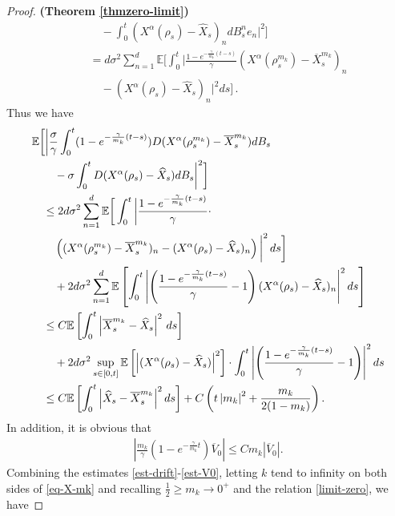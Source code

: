 \documentclass{ims9x6}
\newcommand{\nn}{\nonumber}
\newcommand{\EE}{\mathbb{E}}
\newcommand{\OV}{\overline{V}}
\newcommand{\OX}{\overline{X}}
\begin{document}
\begin{proof}{\textbf{(Theorem \ref{thmzero-limit})}}
{\begin{align}
	&\qquad- \int_0^t  (X^{\alpha}(\rho_s)-\widehat X_s)_ndB_s^ne_n \bigg|^2\bigg]
	\nonumber \\
	&\quad =d{\sigma^2} \sum_{n=1}^d\EE \bigg[\int_0^t \bigg| \frac{1-e^{-\frac{\gamma}{{m_k}}(t-s)}} {\gamma} (X^{\alpha}(\rho^{m_k}_s)-\OX_s^{m_k})_n \nn\\
	&\qquad - (X^{\alpha}(\rho_s)-\widehat X_s)_n\bigg|^2 ds \bigg]\,.
	\end{align}}
	Thus we have
{\small 		\begin{align}
	&\EE \bigg[ \bigg|
	\frac{\sigma}{\gamma}
	\int_0^t(1-e^{-\frac{\gamma}{{m_k}}(t-s)}) D(X^{\alpha}(\rho^{m_k}_s)-\OX_s^{m_k})dB_s\nn\\
	& \quad\quad- \sigma \int_0^t  D(X^{\alpha}(\rho_s)-\widehat X_s)dB_s \bigg|^2\bigg]
	\nonumber \\
	&\quad \leq 
	{2d\sigma^2} \sum_{n=1}^d
	\EE \bigg[ 
	\int_0^t \bigg| \frac{1-e^{-\frac{\gamma}{{m_k}}(t-s)}} {\gamma}   \cdot \nn\\
	&\qquad \left( (X^{\alpha}(\rho^{m_k}_s)-\OX_s^{m_k})_n -     (X^{\alpha}(\rho_s)-\widehat X_s)_n\right) \bigg|^2\,ds\bigg]
	\nonumber \\
	&\qquad+  {2d\sigma^2}  \sum_{n=1}^d \EE \left[ 
	\int_0^t \left|
	\left(
	\frac{1-e^{-\frac{\gamma}{{m_k}}(t-s)}} {\gamma} -1
	\right)
	(X^{\alpha}(\rho_s)-\widehat X_s)_n\right|^2 ds \right]
	\nonumber \\
	&\quad \leq 
	C
	\EE \left[ 
	\int_0^t \left|     \OX_s^{m_k}     -\widehat X_s  \right|^2\,ds\right]\nonumber \\
	&\qquad +  {2d\sigma^2} \sup_{s\in [0,t]}  \EE \left[  \left|(X^{\alpha}(\rho_s)-\widehat X_s)\right|^2 \right] \cdot 
	\int_0^t \left|
	\left(
	\frac{1-e^{-\frac{\gamma}{{m_k}}(t-s)}} {\gamma} -1
	\right)
	\right|^2 ds  
	\notag\\
	 &\quad \leq 
	C \EE \left[ \int_0^t  \left|   \widehat X_s-\OX_s^{m_k} \right|^2 ds \right]
	+ C  
	\left( t \left|{m_k}\right|^2  + \frac{m_k}{2(1-m_k)}   \right) .
	\label{ineq-converge}
	\end{align}}
	In addition, it is obvious that
	\begin{align}
	\left| \frac{m_k}{\gamma}(1-e^{-\frac{\gamma}{m_k}t})\OV_0\right|
	\leq  C m_k \left| \OV_0\right|. \label{est-V0}
	\end{align}	
	Combining the estimates \eqref{est-drift}-\eqref{est-V0}, letting $k$ tend to infinity on both sides of \eqref{eq-X-mk} and recalling $\frac{1}{2}\geq m_k \rightarrow 0^+$ and the relation \eqref{limit-zero}, we have

\end{proof}
\end{document}

